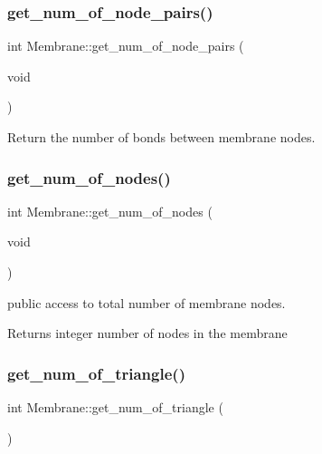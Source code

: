 \mbox{\label{classMembrane_a8dba8af8f79eeb588edfea309e530368}} 
\subsubsection{\texorpdfstring{get\_num\_of\_node\_pairs()}{get\_num\_of\_node\_pairs()}}
{\footnotesize\ttfamily int Membrane\+::get\+\_\+num\+\_\+of\+\_\+node\+\_\+pairs (\begin{DoxyParamCaption}\item[{void}]{ }\end{DoxyParamCaption})\hspace{0.3cm}{\ttfamily [inline]}}

Return the number of bonds between membrane nodes. \mbox{\label{classMembrane_a7ab07bf9d307d2e2b8e457a9167fff78}} 
\subsubsection{\texorpdfstring{get\_num\_of\_nodes()}{get\_num\_of\_nodes()}}
{\footnotesize\ttfamily int Membrane\+::get\+\_\+num\+\_\+of\+\_\+nodes (\begin{DoxyParamCaption}\item[{void}]{ }\end{DoxyParamCaption})\hspace{0.3cm}{\ttfamily [inline]}}



public access to total number of membrane nodes. 

\begin{DoxyReturn}{Returns}
integer number of nodes in the membrane 
\end{DoxyReturn}
\mbox{\label{classMembrane_a2ab5e9ec0ae823cfa224be4db90e11c5}} 
\subsubsection{\texorpdfstring{get\_num\_of\_triangle()}{get\_num\_of\_triangle()}}
{\footnotesize\ttfamily int Membrane\+::get\+\_\+num\+\_\+of\+\_\+triangle (\begin{DoxyParamCaption}{ }\end{DoxyParamCaption})\hspace{0.3cm}{\ttfamily [inline]}}

